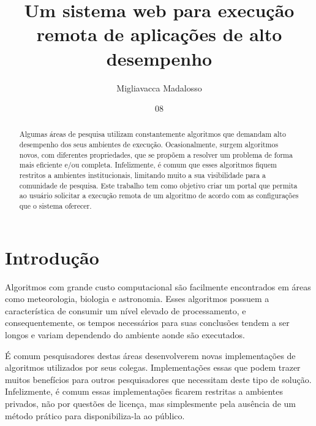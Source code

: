 \documentclass[tg]{mdtufsm}
\title{Um sistema web para execução remota de aplicações de alto desempenho}
\author{Migliavacca Madalosso}{Otávio}
\institute{Centro de Tecnologia}
\date{08}{Outubro}{2015}
\begin{document}
\maketitle
\makeapprove

\begin{abstract}
Algumas áreas de pesquisa utilizam constantemente algoritmos que demandam alto desempenho dos seus ambientes de execução. Ocasionalmente, surgem algoritmos novos, com diferentes propriedades, que se propõem a resolver um problema de forma mais eficiente e/ou completa. Infelizmente, é comum que esses algoritmos fiquem restritos a ambientes institucionais, limitando muito a sua visibilidade para a comunidade de pesquisa. Este trabalho tem como objetivo criar um portal que permita ao usuário solicitar a execução remota de um algoritmo de acordo com as configurações que o sistema oferecer.
\end{abstract}

\tableofcontents

\setlength{\baselineskip}{1.5\baselineskip}


\chapter{Introdução}

Algoritmos com grande custo computacional são facilmente encontrados em áreas como meteorologia, biologia e astronomia. Esses algoritmos possuem a característica de consumir um nível elevado de processamento, e consequentemente, os tempos necessários para suas conclusões tendem a ser longos e variam dependendo do ambiente aonde são executados.

É comum pesquisadores destas áreas desenvolverem novas implementações de algoritmos utilizados por seus colegas. Implementações essas que podem trazer muitos benefícios para outros pesquisadores que necessitam deste tipo de solução. Infelizmente, é comum essas implementações ficarem restritas a ambientes privados, não por questões de licença, mas simplesmente pela ausência de um método prático para disponibiliza-la ao público.
\end{document}
